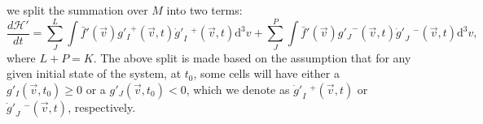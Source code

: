 we split the summation over $M$ into two terms:
%
\begin{equation}\label{eq:classicalH3}
    \frac{d\mathcal{H}'}{dt}=\sum_J^{L}\int
      \bar f'(\vec{v}){g'_I}^{+}(\vec{v},t){{\dot{g}}'}_I\phantom{.}\!^{+}(\vec{v},t)\mathrm{d}^3v
        +\sum_J^{P}\int
      \bar f'(\vec{v}){g'_J}^{-}(\vec{v},t){{\dot{g}}'}_J\phantom{.}\!^{-}(\vec{v},t)\mathrm{d}^3v,
\end{equation}
%
where $L+P=K$. The above split is made based on the assumption that for any given initial
state of the system, at $t_0$, some cells will have either a $g'_I(\vec{v},t_0)\geq0$
or a $g'_J(\vec{v},t_0)<0$,
which we denote as ${{\dot{g}}'}_I\phantom{.}\!^{+}(\vec{v},t)$
or ${{\dot{g}}'}_J\phantom{.}\!^{-}(\vec{v},t)$, respectively.
%
\begin{comment}
Cells with ${{\dot{g}}'}_I\phantom{.}\!^{+}(\vec{v},t)$, $I=1,\,\dots\,,L$, 
have an excess of particles and/or energy (relative to the mean value in equilibrium).
In contrast, cells with ${{\dot{g}}'}_J\phantom{.}\!^{-}(\vec{v},t)$, $J=1,\,\dots\,,P$,
have a scarcity of particles and/or energy
(relative to the mean value in equilibrium).
In addition, $\dot{g}^{+}_{J}$ represents the
change on the deviation on cells that have an excess of particles or energy
while $\dot{g}^{-}_{J}$  represents the change on the deviations on cells that
have missing particles or energy.
On the other hand, $g^{+}_{J}$  represents the value of the deviation on cells
that have an excess of particles or energy. In contrast, $g^{-}_{J}$ represents
the value of the deviation on cells that have missing particles or energy.
Also, on the one hand, $\dot{g}^{+}_{J}<0$ describes the loss of particles
and/or energy and so, $g^{+}_{J}>0$. On the other hand, $\dot{g}^{-}_{J}>0$
describes the gain of particles and/or energy and therefore $g^{-}_{J}<0$.

We sort the previous ideas in the following form
%
\begin{equation}\label{separacionclassical}
\begin{array}{rl}
  g^{+}_{J}=+|g^{+}_{J}|; & \dot{g}^{+}_{J}=-|\dot{g}^{+}_{J}|,\\
  g^{-}_{J}=-|g^{-}_{J}|; & \dot{g}^{-}_{J}=+|\dot{g}^{-}_{J}|,
 \end{array}
\end{equation}
%
and consequently, (\ref{classicalH3}) obtains the following form
\end{comment}
